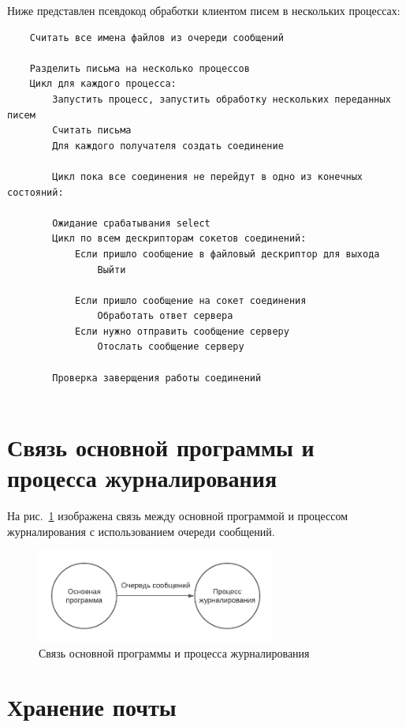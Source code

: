 \documentclass[a4paper,12pt]{report}
\begin{document}
Ниже представлен псевдокод обработки клиентом писем в нескольких процессах:

\begin{verbatim}
    Считать все имена файлов из очереди сообщений

    Разделить письма на несколько процессов
    Цикл для каждого процесса:
        Запустить процесс, запустить обработку нескольких переданных писем
        Считать письма
        Для каждого получателя создать соединение

        Цикл пока все соединения не перейдут в одно из конечных состояний:

        Ожидание срабатывания select
        Цикл по всем дескрипторам сокетов соединений:
            Если пришло сообщение в файловый дескриптор для выхода
                Выйти

            Если пришло сообщение на сокет соединения
                Обработать ответ сервера
            Если нужно отправить сообщение серверу
                Отослать сообщение серверу

        Проверка заверщения работы соединений
    
\end{verbatim}


\section{Связь основной программы и процесса журналирования}

На рис.~\ref{fig:ipc} изображена связь между основной программой и процессом журналирования с использованием очереди сообщений.

\begin{figure}[h]
    \centering
    \includegraphics[width=0.7\textwidth]{pics/ipc.pdf}
    \caption{Связь основной программы и процесса журналирования}
    \label{fig:ipc}
\end{figure}


\section{Хранение почты}
\end{document}
